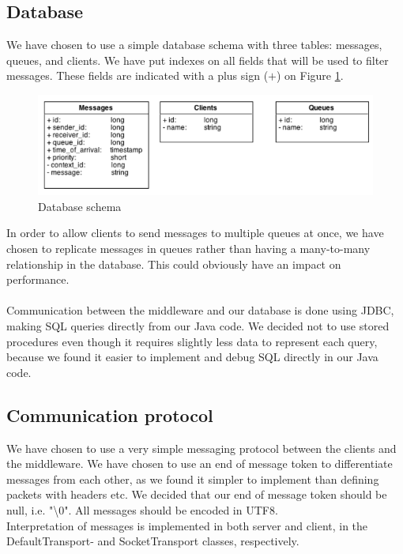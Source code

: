 \documentclass{article}
\begin{document}
        \subsection{Database}
            We have chosen to use a simple database schema with three tables: messages, queues, and clients. We have put indexes on all fields that will be used to filter messages. These fields are indicated with a plus sign ($+$) on Figure \ref{fig:database_schema}. 
            \begin{figure}[H]
                \centering
                \includegraphics[scale=0.50]{database_schema}
                \caption{Database schema}
                \label{fig:database_schema}
            \end{figure}
            In order to allow clients to send messages to multiple queues at once, we have chosen to replicate messages in queues rather than having a many-to-many relationship in the database. This could obviously have an impact on performance.\\
            \\
            Communication between the middleware and our database is done using JDBC, making SQL queries directly from our Java code. We decided not to use stored procedures even though it requires slightly less data to represent each query, because we found it easier to implement and debug SQL directly in our Java code. 

        \subsection{Communication protocol}
            We have chosen to use a very simple messaging protocol between the clients and the middleware. We have chosen to use an end of message token to differentiate messages from each other, as we found it simpler to implement than defining packets with headers etc. We decided that our end of message token should be null, i.e. "\textbackslash0". All messages should be encoded in UTF8.\\
            Interpretation of messages is implemented in both server and client, in the DefaultTransport- and SocketTransport classes, respectively.
\end{document}

